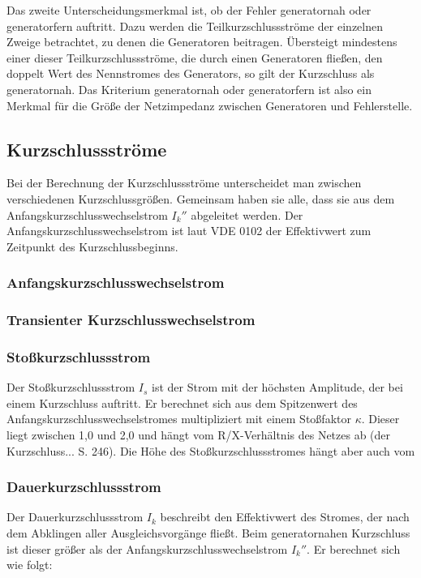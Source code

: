 \documentclass{scrartcl}
\begin{document}
\begin{onehalfspace}
Das zweite Unterscheidungsmerkmal ist, ob der Fehler \glqq generatornah \grqq{} oder \glqq generatorfern\grqq{} auftritt. Dazu werden die Teilkurzschlussströme der einzelnen Zweige betrachtet, zu denen die Generatoren beitragen. Übersteigt mindestens einer dieser Teilkurzschlussströme, die durch einen Generatoren fließen, den doppelt Wert des Nennstromes des Generators, so gilt der Kurzschluss als generatornah. Das Kriterium \glqq generatornah oder generatorfern\grqq{} ist also ein Merkmal für die Größe der Netzimpedanz zwischen Generatoren und Fehlerstelle.

\subsection{Kurzschlussströme}
Bei der Berechnung der Kurzschlussströme unterscheidet man zwischen verschiedenen Kurzschlussgrößen. Gemeinsam haben sie alle, dass sie aus dem Anfangskurzschlusswechselstrom $I_k''$ abgeleitet werden. Der Anfangskurzschlusswechselstrom ist laut VDE 0102 der \glqq Effektivwert zum Zeitpunkt des Kurzschlussbeginns\grqq.

\subsubsection{Anfangskurzschlusswechselstrom}


\subsubsection{Transienter Kurzschlusswechselstrom}

\subsubsection{Stoßkurzschlussstrom}
Der Stoßkurzschlussstrom $I_s$ ist der Strom mit der höchsten Amplitude, der bei einem Kurzschluss auftritt. Er berechnet sich aus dem Spitzenwert des Anfangskurzschlusswechselstromes multipliziert mit einem Stoßfaktor $\kappa$. Dieser liegt zwischen 1,0 und 2,0 und hängt vom R/X-Verhältnis des Netzes ab (der Kurzschluss... S. 246). Die Höhe des Stoßkurzschlussstromes hängt aber auch vom 

\subsubsection{Dauerkurzschlussstrom}
Der Dauerkurzschlussstrom $I_k$ beschreibt den Effektivwert des Stromes, der nach dem Abklingen aller Ausgleichsvorgänge fließt. Beim generatornahen Kurzschluss ist dieser größer als der Anfangskurzschlusswechselstrom $I_k''$. Er berechnet sich wie folgt: \\


\end{onehalfspace}
\end{document}
